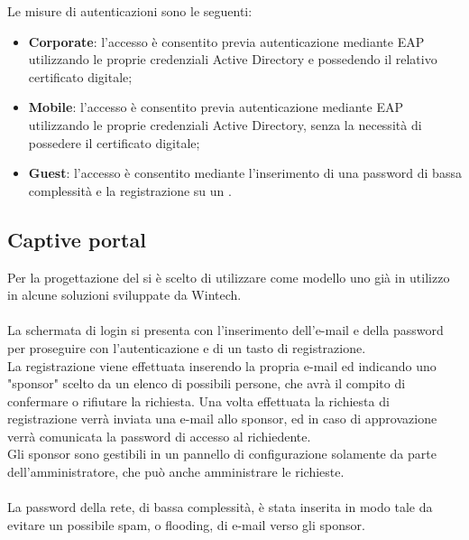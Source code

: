 \documentclass[Realizzazione.tex]{subfiles}
\begin{document}
Le misure di autenticazioni sono le seguenti:
\begin{itemize}
	\item \textbf{Corporate}: l'accesso è consentito previa autenticazione mediante EAP utilizzando le proprie credenziali Active Directory e possedendo il relativo certificato digitale;
	\item \textbf{Mobile}: l'accesso è consentito previa autenticazione mediante EAP utilizzando le proprie credenziali Active Directory, senza la necessità di possedere il certificato digitale;
	\item \textbf{Guest}: l'accesso è consentito mediante l'inserimento di una password di bassa complessità e la registrazione su un .
\end{itemize}


\subsection{Captive portal}
Per la progettazione del  si è scelto di utilizzare come modello uno già in utilizzo in alcune soluzioni sviluppate da Wintech. \\\\
La schermata di login si presenta con l'inserimento dell'e-mail e della password per proseguire con l'autenticazione e di un tasto di registrazione. \\
La registrazione viene effettuata inserendo la propria e-mail ed indicando uno "sponsor" scelto da un elenco di possibili persone, che avrà il compito di confermare o rifiutare la richiesta.
Una volta effettuata la richiesta di registrazione verrà inviata una e-mail allo sponsor, ed in caso di approvazione verrà comunicata la password di accesso al richiedente. \\
Gli sponsor sono gestibili in un pannello di configurazione solamente da parte dell'amministratore, che può anche amministrare le richieste. \\\\
La password della rete, di bassa complessità, è stata inserita in modo tale da evitare un possibile spam, o flooding, di e-mail verso gli sponsor.
\end{document}
